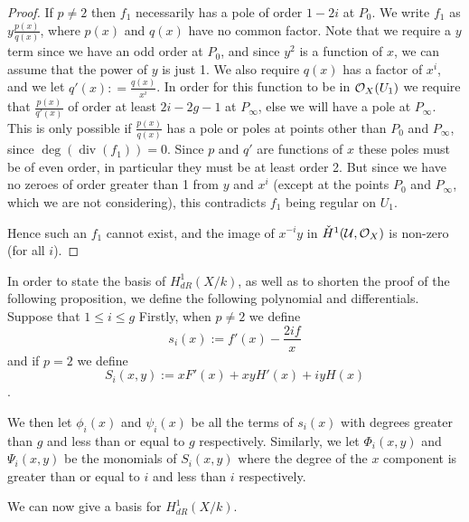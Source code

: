\documentclass[draft, 11pt]{article} %
\theoremstyle{plain}
\theoremstyle{remark}
\newcommand{\cO}{{\cal O}}
\newcommand{\cU}{{\mathcal U}}
\DeclareMathOperator{\di}{div}
\begin{document}
\begin{proof}
If $p \neq 2$ then $f_1$ necessarily has a pole of order $1-2i$ at $P_0$.
We write $f_1$ as $y \frac{p(x)}{q(x)}$, where $p(x)$ and $q(x)$ have no common factor.
Note that we require a $y$ term since we have an odd order at $P_0$, and since $y^2$ is a function of $x$, we can assume that the power of $y$ is just 1.
We also require $q(x)$ has a factor of $x^i$, and we let $q'(x) : = \frac{q(x)}{x^i}$.
In order for this function to be in $\cO_X(U_1)$ we require that $\frac{p(x)}{q'(x)}$ of order at least $2i-2g-1$ at $P_\infty$, else we will have a pole at $P_\infty$.
This is only possible if $\frac{p(x)}{q(x)}$ has a pole or poles at points other than $P_0$ and $P_\infty$, since $\deg(\di(f_1)) = 0$.
Since $p$ and $q'$ are functions of $x$ these poles must be of even order, in particular they must be at least order 2.
But since we have no zeroes of order greater than 1 from $y$ and $x^i$ (except at the points $P_0$ and $P_\infty$, which we are not considering), this contradicts $f_1$ being regular on $U_1$.

Hence such an $f_1$ cannot exist, and the image of $x^{-i}y$ in $\check{H}^1(\cU,\cO_X)$ is non-zero (for all $i$).

\end{proof}


In order to state the basis of $H^1_{dR}(X/k)$, as well as to shorten the proof of the following proposition, we define the following polynomial and differentials.
Suppose that $1 \leq i \leq g$
Firstly, when $p\neq 2$ we define
\[
s_i(x) := f'(x) - \frac{2if}{x}
\]
and if $p = 2$ we define
\[
S_i(x,y) := xF'(x) + xyH'(x) + iyH(x)
\].

We then let $\phi_i(x)$ and $\psi_i(x)$ be all the terms of $s_i(x)$ with degrees greater than $g$ and less than or equal to $g$ respectively.
Similarly, we let $\Phi_i(x,y)$ and $\Psi_i(x,y)$ be the monomials of $S_i(x,y)$ where the degree of the $x$ component is greater than or equal to $i$ and less than $i$ respectively.

We can now give a basis for $H^1_{dR}(X/k)$.\\
\end{document}
